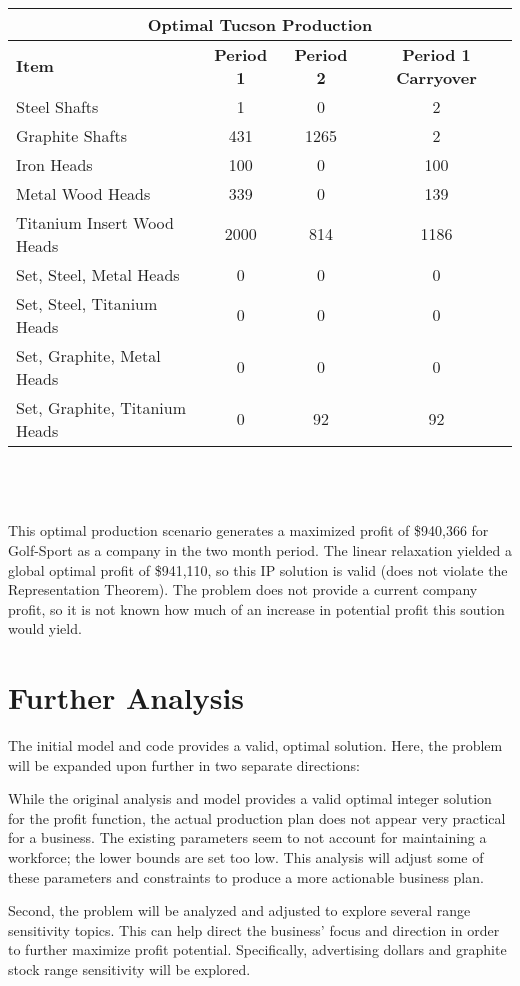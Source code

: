 \documentclass{article}
\begin{document}
\vspace{5mm}
\\
\noindent
\begin{tabular}{ l c c c }
\hline
\multicolumn{4}{|c|}{Optimal Tucson Production} \\
\hline
\textbf{Item} & \textbf{Period 1} & \textbf{Period 2} & \textbf{Period 1 Carryover} \\
Steel Shafts & 1 & 0 & 2 \\
Graphite Shafts & 431 & 1265 & 2 \\
Iron Heads & 100 & 0 & 100 \\
Metal Wood Heads & 339 & 0 & 139 \\
Titanium Insert Wood Heads & 2000 & 814 & 1186 \\
Set, Steel, Metal Heads & 0 & 0 & 0 \\
Set, Steel, Titanium Heads & 0 & 0 & 0 \\
Set, Graphite, Metal Heads & 0 & 0 & 0 \\
Set, Graphite, Titanium Heads & 0 & 92 & 92\\
\end{tabular}
\\
\\
\vspace{5mm}
\\

This optimal production scenario generates a maximized profit of \$940,366 for Golf-Sport as a company in the two month period.  The linear relaxation yielded a global optimal profit of \$941,110, so this 
IP solution is valid (does not violate the Representation Theorem).  The problem does not provide a current company profit, so it is not known how much of an increase in potential profit this soution would yield.  

\section{Further Analysis}
The initial model and code provides a valid, optimal solution.  Here, the problem will be expanded upon further in two separate directions:
\par
While the original analysis and model provides a valid optimal integer solution for the profit function, the actual production plan does not appear very practical for a business.  
The existing parameters seem to not account for maintaining a workforce; the lower bounds are set too low.  This analysis will adjust some of these parameters and constraints to produce a more 
actionable business plan.
\par
Second, the problem will be analyzed and adjusted to explore several range sensitivity topics.  This can help direct the business' focus and direction in order to further maximize profit potential.  Specifically, advertising dollars and graphite stock range sensitivity will be explored.
\end{document}
